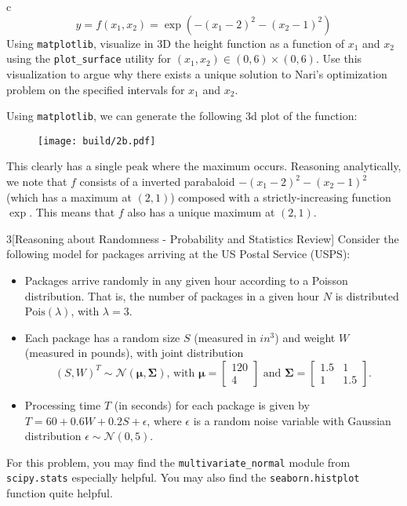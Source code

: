 \documentclass[expanded]{pset}
\begin{document}
\begin{parts}
\begin{part}{c}
    $$y = f(x_1, x_2) = \exp\left(-(x_1 - 2)^2 - (x_2 - 1)^2 \right)$$
    Using \texttt{matplotlib}, visualize in 3D the height function as a function of $x_1$ and $x_2$ using the \texttt{plot\_surface} utility for $(x_1, x_2) \in (0, 6) \times (0, 6)$. 
    Use this visualization to argue why there exists a unique solution to Nari's optimization problem on the specified intervals for $x_1$ and $x_2$.
  \end{part}

  Using \texttt{matplotlib}, we can generate the following 3d plot of the function:

  \begin{figure}[ht]
    \centering
    \texttt{[image: build/2b.pdf]}
  \end{figure}\noindent

  This clearly has a single peak where the maximum occurs. Reasoning analytically, we note that $f$ consists of a inverted parabaloid $-(x_1-2)^2 - (x_2 - 1)^2$ (which has a maximum at $(2,1)$) composed with a strictly-increasing function $\exp$. This means that $f$ also has a unique maximum at $(2, 1)$.
\end{parts}


\begin{problem}{3}[Reasoning about Randomness - Probability and Statistics Review]
Consider the following model for packages arriving at the US Postal Service (USPS):
\begin{itemize}
    \item Packages arrive randomly in any given hour according to a Poisson distribution. That is, the number of packages in a given hour $N$ is distributed $\textrm{Pois}(\lambda)$, with $\lambda = 3$.
    \item Each package has a random size $S$ (measured in $in^3$) and weight $W$ (measured in pounds), with joint distribution
    $$(S, W)^{T} \sim \mathcal{N}\left( \boldsymbol{\mu}, \boldsymbol{\Sigma}\right) \text{, with } \boldsymbol{\mu} = \begin{bmatrix} 120 \\ 4 \end{bmatrix} \text{ and } \boldsymbol{\Sigma} = \begin{bmatrix} 1.5 & 1 \\ 1 & 1.5 \end{bmatrix}.$$
    \item Processing time $T$ (in seconds) for each package is given by $T = 60 + 0.6 W + 0.2 S + \epsilon$, where $\epsilon$ is a random noise variable with Gaussian distribution $\epsilon \sim \mathcal{N}(0, 5)$.
\end{itemize}
For this problem, you may find the \texttt{multivariate\_normal} module from \texttt{scipy.stats} especially helpful. You may also find the \texttt{seaborn.histplot} function quite helpful. 
\end{problem}
\end{document}
